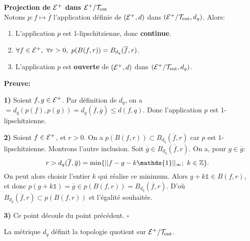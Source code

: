 \begin{defippt}\label{préli p}\textbf{Projection de ${\mathcal{E}}^+$ dans 		  $\mathcal{E}^+/\mathcal{T}_{\mathrm{ent}}$}\\
		Notons $p:f\mapsto \overline{f}$ l'application définie de $({\mathcal{E}}^+,d)$ dans $(\mathcal{E}^+/\mathcal{T}_{\mathrm{ent}},d_q)$.
		 Alors:
		\begin{enumerate}
				\item L'application $p$ est 1-lipschitzienne, donc \textbf{continue}.
				\item $\forall f\in \Ec^+,\ \forall r>0,\ p(B(f,r))=B_{d_q}(\overline{f},r)$.
				\item L'application $p$ est \textbf{ouverte} de $({\mathcal{E}}^+,d)$ dans $(\mathcal{E}^+/\mathcal{T}_{\mathrm{ent}},d_q)$.
		\end{enumerate}
\end{defippt}


	\textbf{Preuve:}
	\par \textbf{1)} Soient $f, g \in {\mathcal{E}}^+$. Par définition de $d_q$, on a $=d_q(p(f),p(g))=d_q(\overline{f},\overline{g})\leq d(f,q)$. Donc l'application $p$ est 1-lipschitzienne.\\

	\par \textbf{2)} Soient $f \in {\mathcal{E}}^+$, et $r>0$. On a $p(B(f,r))\subset B_{d_q}(\overline{f},r)$ car $p$ est $1$-lipschitzienne. Montrons l'autre inclusion. Soit $\overline{g} \in B_{d_q}(\overline{f},r)$. On a, pour $g\in \overline{g}$:
		$$r>d_q(\overline{f},\overline{g})=\min\lbrace ||f-g-k\mathds{1}||_{\infty};\ k \in \Zbb\rbrace.$$
	On peut alors choisir l'entier $k$ qui réalise ce minimum. Alors $g	+k\mathds{1} \in B(f,r)$, et donc $p(g+k\mathds{1})=\overline{g} \in p(B(f,r))=B_{d_q}(\overline{f},r)$. D'où $B_{d_q}(\overline{f},r) \subset p(B(f,r))$ et l'égalité souhaitée.\\

	\par \textbf{3)} Ce point découle du point précédent. \hfill $\square$\\













\begin{corollary}\label{distance dq donne topo quotient}
		La métrique $d_q$ définit la topologie quotient sur ${\mathcal{E}}^+/\mathcal{T}_{\mathrm{ent}}$.
\end{corollary}

